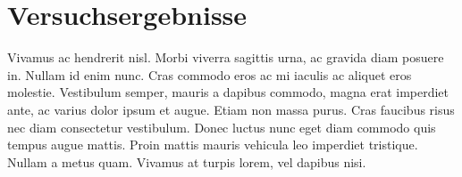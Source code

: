 \chapter{Versuchsergebnisse}

  Vivamus ac hendrerit nisl. Morbi viverra sagittis urna, ac gravida diam posuere in. Nullam id enim nunc. Cras commodo eros ac mi iaculis ac aliquet eros molestie. Vestibulum semper, mauris a dapibus commodo, magna erat imperdiet ante, ac varius dolor ipsum et augue. Etiam non massa purus. Cras faucibus risus nec diam consectetur vestibulum. Donec luctus nunc eget diam commodo quis tempus augue mattis. Proin mattis mauris vehicula leo imperdiet tristique. Nullam a metus quam. Vivamus at turpis lorem, vel dapibus nisi.
